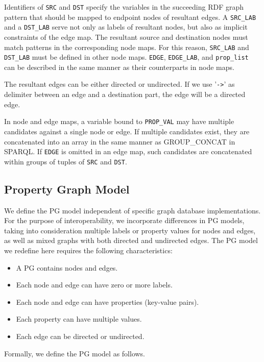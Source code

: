\documentclass[runningheads]{llncs}
\begin{document}
 Identifiers of \texttt{SRC} and \texttt{DST} specify the variables in the succeeding RDF graph pattern that should be mapped to endpoint nodes of resultant edges.
A \texttt{SRC\_LAB} and a \texttt{DST\_LAB} serve not only as labels of resultant nodes, but also as implicit constraints of the edge map.
The resultant source and destination nodes must match patterns in the corresponding node maps.
For this reason, \texttt{SRC\_LAB} and \texttt{DST\_LAB} must be defined in other node maps.
\texttt{EDGE}, \texttt{EDGE\_LAB}, and \texttt{prop\_list} can be described in the same manner as their counterparts in node maps.

The resultant edges can be either directed or undirected. If we use '\texttt{->}' as delimiter between an edge and a destination part, the edge will be a directed edge.

In node and edge maps, a variable bound to \texttt{PROP\_VAL} may have multiple candidates against a single node or edge. If multiple candidates exist, they are concatenated into an array in the same manner as GROUP\_CONCAT in SPARQL. If \texttt{EDGE} is omitted in an edge map, such candidates are concatenated within groups of tuples of \texttt{SRC} and \texttt{DST}.


\subsection{Property Graph Model}
We define the PG model independent of specific graph database implementations. For the purpose of interoperability, we incorporate differences in PG models, taking into consideration multiple labels or property values for nodes and edges, as well as mixed graphs with both directed and undirected edges. The PG model we redefine here requires the following characteristics:

\begin{itemize}
    \item A PG contains nodes and edges.
    \item Each node and edge can have zero or more labels.
    \item Each node and edge can have properties (key-value pairs).
    \item Each property can have multiple values.
    \item Each edge can be directed or undirected.
\end{itemize}
Formally, we define the PG model as follows.
\end{document}
